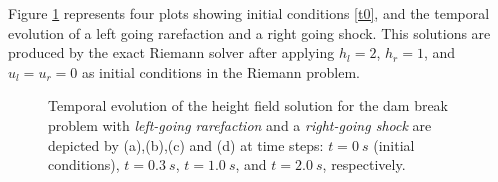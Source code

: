 \documentclass[11pt,a4paper]{article}
\begin{document}
	
	Figure \ref{hor2} represents four plots showing initial conditions \ref{t0}, and the temporal evolution of a left going  rarefaction and a right going shock. This solutions are produced by the exact Riemann solver after applying $h_l = 2$, $h_r = 1$, and $u_l = u_r = 0$ as initial conditions in  the Riemann problem.
	
\begin{figure}[H]%
	\centering
	\quad
	
	\quad
	\caption{Temporal evolution of the height field solution for the dam break problem with {\em left-going rarefaction} and a {\em right-going shock}  are depicted by (a),(b),(c) and (d) at time steps: $t=0~s$ (initial conditions), $t = 0.3~s$,  $t = 1.0~s$, and $t = 2.0~s$, respectively.  }
	\label{hor2}
\end{figure}
\end{document}
